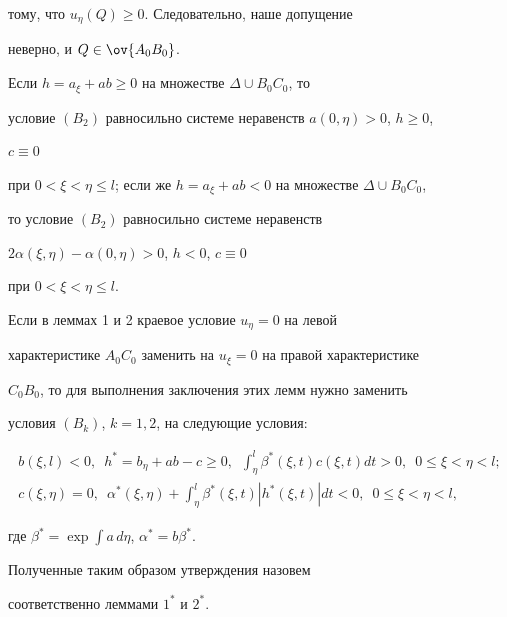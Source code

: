 тому, что $u_\eta(Q)\ge0$. Следовательно, наше допущение 


неверно, и $Q\in\ov{A_0B_0}$. 


 


\begin{note} 


Если $h=a_\xi+a b\ge0$ на множестве $\Delta\cup B_0C_0$, то 


условие $(B_2)$ равносильно системе неравенств $a(0,\eta)>0$, $h\ge0$, 


$c\equiv0$ 


при $0<\xi<\eta\le l$; если же $h=a_\xi+a b<0$ на множестве $\Delta\cup 


B_0C_0$, 


то условие $(B_2)$ равносильно системе неравенств 


$2\alpha(\xi,\eta)-\alpha(0,\eta)>0$, $h<0$, $c\equiv0$ 


при $0<\xi<\eta\le l$. 


\end{note} 


 


\begin{note} 


Если в леммах 1 и 2 краевое условие $u_\eta=0$ на левой 


характеристике $A_0C_0$ заменить на $u_\xi=0$ на правой характеристике 


$C_0B_0$, то для выполнения заключения этих лемм нужно заменить 


условия $(B_k)$, $k=1,2$, на следующие условия: 


\begin{gather} 


b(\xi,l)<0,\ \; h^*=b_\eta+a b-c\ge0,\ \; 


\int^l_\eta \beta^*(\xi,t)c(\xi,t)dt>0,\ \; 0\le\xi<\eta<l; 


\tag{$B^*_1$} \\ 


% 


c(\xi,\eta)=0,\ \; \alpha^*(\xi,\eta)+\int^l_\eta \beta^*(\xi,t) 


|h^*(\xi,t)|dt<0,\ \; 0\le\xi<\eta<l,\tag{$B^*_2$} 


\end{gather} 


где $\beta^*=\exp\displaystyle\int a\,d\eta$, $\alpha^*=b\beta^*$. 


Полученные таким образом утверждения назовем 


соответственно леммами $1^*$ и $2^*$. 


\end{note}


